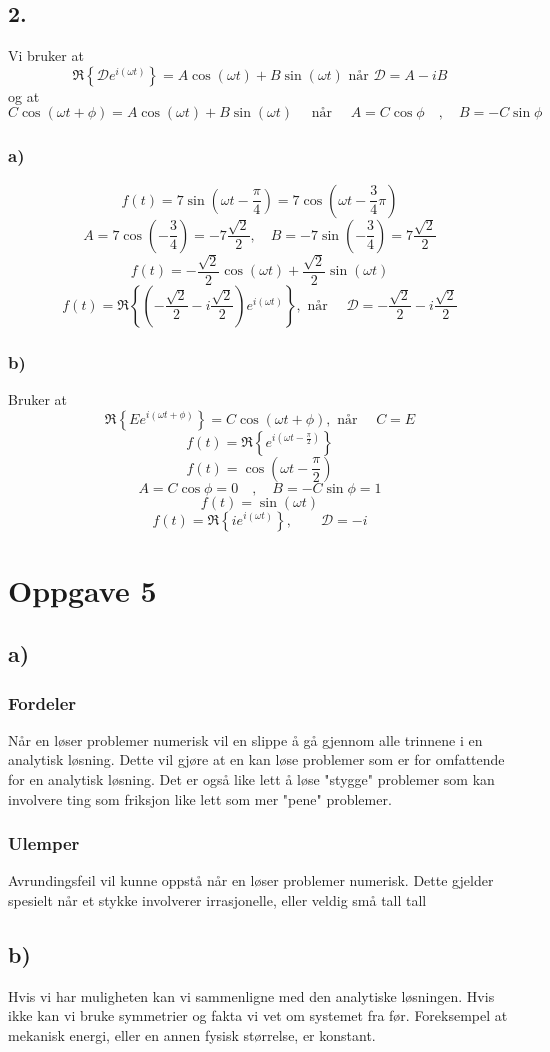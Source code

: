 \documentclass{article}
\begin{document}
\subsection*{2.}
Vi bruker at 
\[
\mathfrak{R} \left\{ 𝒟  e^{i \left(ωt \right) } \right\}  = A \cos (ωt) + B \sin (ωt) \text{ når } 𝒟  = A - iB 
\]
og at 
\[
C \cos (ωt + ϕ) = A \cos (ωt) + B \sin (ωt) \quad \text{ når } \quad A = C \cos ϕ \quad , \quad B = -C \sin ϕ
\]
\subsubsection*{a)}
\[
f(t) = 7 \sin \left( ωt - \frac{π}{4} \right) = 7 \cos \left( ωt - \frac{3}{4}π \right) 
\]
\[
A = 7 \cos \left( -\frac{3}{4} \right) = - 7\frac{\sqrt{2}}{2} , \quad B = -7 \sin \left( - \frac{3}{4} \right) = 7\frac{\sqrt{2}}{2}
\]
\[
f(t) = - \frac{\sqrt{2}}{2} \cos (ωt) + \frac{\sqrt{2}}{2} \sin (ωt)
\]
\[
f(t) = \mathfrak{R} \left\{ \left( - \frac{\sqrt{2}}{2} - i \frac{\sqrt{2}}{2} \right) e^{i(ωt)} \right\}, \text{ når } \quad 𝒟  = - \frac{\sqrt{2}}{2} - i \frac{\sqrt{2}}{2} 
\]
\subsubsection*{b)}
Bruker at 
\[
\mathfrak{R} \left\{ E e^{i(ωt + ϕ)} \right\} = C \cos (ωt + ϕ), \text{ når } \quad C = E
\]
\[
f(t) = \mathfrak{R}  \left\{ e^{i\left( ωt - \frac{π}{2} \right) } \right\} 
\]
\[
f(t) = \cos \left( ωt - \frac{π}{2} \right)
\]
\[
A = C\cos ϕ = 0 \quad , \quad B = - C\sin ϕ = 1
\]
\[
f(t) = \sin (ωt)
\]
\[
f(t) = \mathfrak{R} \left\{ i e^{i(ωt)} \right\}, \qquad 𝒟  = -i
\]

\section*{Oppgave 5}
\subsection*{a)}
\subsubsection*{Fordeler}
Når en løser problemer numerisk vil en slippe å gå gjennom alle trinnene i en analytisk løsning. Dette vil gjøre at en kan løse problemer som er for omfattende for en analytisk løsning. Det er også like lett å løse "stygge" problemer som kan involvere ting som friksjon like lett som mer "pene" problemer. 

\subsubsection*{Ulemper}
Avrundingsfeil vil kunne oppstå når en løser problemer numerisk. Dette gjelder spesielt når et stykke involverer irrasjonelle, eller veldig små tall tall

\subsection*{b)}
Hvis vi har muligheten kan vi sammenligne med den analytiske løsningen. Hvis ikke kan vi bruke symmetrier og fakta vi vet om systemet fra før. Foreksempel at mekanisk energi, eller en annen fysisk størrelse, er konstant. 
\end{document}
